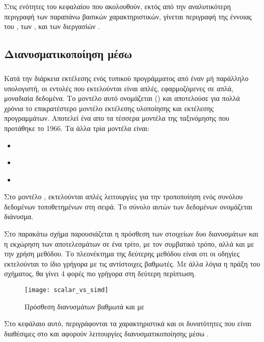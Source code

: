 Στις ενότητες του κεφαλαίου που ακολουθούν, εκτός από την αναλυτικότερη περιγραφή των παραπάνω βασικών χαρακτηριστικών, γίνεται περιγραφή της έννοιας του \emph{}, των \emph{}, και των διεργασίών \emph{}.


\subsection{Διανυσματικοποίηση μέσω \emph{}}
\subparagraph{}

Κατά την διάρκεια εκτέλεσης ενός τυπικού προγράμματος από έναν μή παράλληλο υπολογιστή, οι εντολές που εκτελούνται είναι απλές, εφαρμοζόμενες σε απλά, μοναδιαία δεδομένα. Το μοντέλο αυτό ονομάζεται (\emph{}) και αποτελούσε για πολλά χρόνια το επικρατέστερο μοντέλο εκτέλεσης υλοποίησης και εκτέλεσης προγραμμάτων. Αποτελεί ένα απο τα τέσσερα μοντέλα της ταξινόμησης \emph{} που προτάθηκε το 1966\cite{flynn}. Τα άλλα τρία μοντέλα είναι: 
\begin{itemize}
\item{\emph{}}
\item{\emph{}}
\item{\emph{}}
\end{itemize}


Στο μοντέλο \emph{}, εκτελούνται απλές λειτουργίες για την τροποποίηση ενός συνόλου δεδομένων τοποθετημένων στη σειρά. Το σύνολο αυτών των δεδομένων ονομάζεται διάνυσμα.

Στο παρακάτω σχήμα παρουσιάζεται η πρόσθεση των στοιχείων δυο διανυσμάτων και η εκχώρηση των αποτελεσμάτων σε ένα τρίτο, με τον συμβατικό τρόπο, αλλά και με την χρήση \emph{} μεθόδου. Το πλεονέκτημα της δεύτερης μεθόδου είναι οτι οι \emph{} οδηγίες εκτελούνται το ίδιο γρήγορα με τις αντίστοιχες βαθμωτές. Με άλλα λόγια η πράξη του σχήματος, θα γίνει 4 φορές πιο γρήγορα στη δεύτερη περίπτωση.

\begin{figure}[h]
\texttt{[image: scalar\_vs\_simd]}
\centering
\captionsetup{justification=centering, singlelinecheck=false}
	\caption{ Πρόσθεση διανυσμάτων βαθμωτά και με }
\label{fig:scalar_vs_simd}
\end{figure}

 Στο κεφάλαιο αυτό, περιγράφονται τα χαρακτηριστικά και οι δυνατότητες που είναι διαθέσιμες στο \emph{} και αφορούν λειτουργίες διανυσματικοποίησης μέσω \emph{}. 

